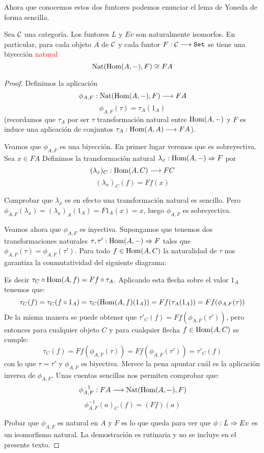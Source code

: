 Ahora que conocemos estos dos funtores podemos enunciar el lema
de Yoneda de forma sencilla.

\begin{theorem}
  Sea $\mathcal{C}$ una categoría. Los funtores $L$ y $Ev$ son naturalmente isomorfos.
  En particular, para cada objeto $A$ de $\mathcal{C}$ y cada funtor $F : \mathcal{C}\longrightarrow \texttt{Set}$
  se tiene una biyección \textcolor{red}{natural}
  $$\operatorname{Nat}(\operatorname{Hom}(A, -), F) \cong FA$$
\end{theorem}
\begin{proof}
  Definimos la aplicación
  $$\phi_{A, F} : \operatorname{Nat}(\operatorname{Hom}(A, -), F)\longrightarrow FA$$
  $$\phi_{A, F}(\tau) = \tau_A (1_A)$$
  (recordamos que $\tau_A$ por ser $\tau$ transformación natural entre $\operatorname{Hom}(A, -)$ y $F$ es
  induce una aplicación de conjuntos $\tau_A : \operatorname{Hom}(A, A)\longrightarrow F A$).

  Veamos que $\phi_{A, F}$ es una biyección. En primer lugar veremos que es sobreyectiva. Sea $x \in FA$
  Definimos la transformación natural $\lambda_x : \operatorname{Hom}(A, -)\Rightarrow F$ por
  $$(\lambda_x)_C : \operatorname{Hom}(A, C)\longrightarrow F C$$
  $$(\lambda_x)_C(f) = Ff(x)$$

  Comprobar que $\lambda_x$ es en efecto una transformación natural es sencillo. Pero
  $\phi_{A, F}(\lambda_x) = (\lambda_x)_A (1_A) = F1_A(x) = x$, luego $\phi_{A, F}$
  es sobreyectiva.

  Veamos ahora que $\phi_{A, F}$ es inyectiva. Supongamos que tenemos
  dos transformaciones naturales $\tau, \tau' : \operatorname{Hom}(A, -)\Rightarrow F$
  tales que $\phi_{A, F}(\tau) = \phi_{A, F}(\tau')$. Para todo $f \in \operatorname{Hom}(A, C)$
  la naturalidad de $\tau$ nos garantiza la conmutatividad
  del siguiente diagrama:
\begin{center}
  \end{center}


  Es decir $\tau_C \circ \operatorname{Hom}(A, f) = F f \circ \tau_A$. Aplicando
  esta flecha sobre el valor $1_A$ tenemos que:
$$\tau_C(f) = \tau_C(f \circ 1_A) = \tau_C(\operatorname{Hom}(A, f)(1_A)) = F f(\tau_A(1_A)) = Ff(\phi_{A, F}(\tau))$$
  De la misma manera se puede obtener que $\tau'_C(f)  = Ff(\phi_{A, F}(\tau'))$, pero entonces para cualquier objeto $C$ y para cualquier flecha $f \in \operatorname{Hom}(A, C)$
  se cumple:
  $$\tau_C(f) = Ff (\phi_{A,F}(\tau)) = Ff(\phi_{A, F}(\tau')) = \tau'_C(f)$$
  con lo que $\tau = \tau'$ y $\phi_{A, F}$ es biyectiva.
  Merece la pena apuntar cuál es la aplicación inversa de $\phi_{A, F}$.
  Unas cuentas sencillas nos permiten comprobar que:
  $$\phi_{A,F}^{-1} : FA\longrightarrow \operatorname{Nat}(\operatorname{Hom}(A, -), F)$$
  $$\phi_{A,F}^{-1}(a)_C(f) = (Ff)(a)$$

  Probar que $\phi_{A, F}$ es natural en $A$ y $F$ es lo que queda para ver
  que $\phi : L\Rightarrow Ev$ es un isomorfismo natural. La demostración es
  rutinaria y no se incluye en el presente texto.
\end{proof}

